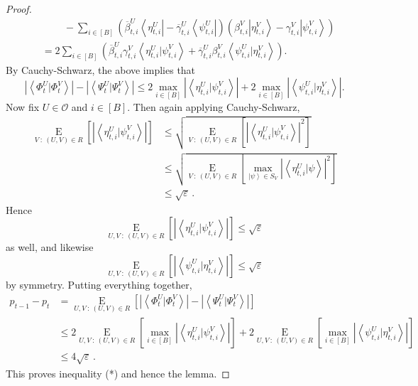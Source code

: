 \documentclass[10pt]{article}
\theoremstyle{definition}
\numberwithin{equation}{section}
\begin{document}
\begin{proof}
\begin{align*}
&  ~~~~~~~~~~-\sum_{i\in\left[  B\right]  }\left(  \overline{\beta}_{t,i}%
^{U}\left\langle \eta_{t,i}^{U}\right\vert -\overline{\gamma}_{t,i}%
^{U}\left\langle \psi_{t,i}^{U}\right\vert \right)  \left(  \beta_{t,i}%
^{V}\left\vert \eta_{t,i}^{V}\right\rangle -\gamma_{t,i}^{V}\left\vert
\psi_{t,i}^{V}\right\rangle \right) \\
&  =2\sum_{i\in\left[  B\right]  }\left(  \overline{\beta}_{t,i}^{U}%
\gamma_{t,i}^{V}\left\langle \eta_{t,i}^{U}|\psi_{t,i}^{V}\right\rangle
+\overline{\gamma}_{t,i}^{U}\beta_{t,i}^{V}\left\langle \psi_{t,i}^{U}%
|\eta_{t,i}^{V}\right\rangle \right)  .
\end{align*}
By Cauchy-Schwarz, the above implies that%
\[
\left\vert \left\langle \Phi_{t}^{U}|\Phi_{t}^{V}\right\rangle \right\vert
-\left\vert \left\langle \Psi_{t}^{U}|\Psi_{t}^{V}\right\rangle \right\vert
\leq2\max_{i\in\left[  B\right]  }\left\vert \left\langle \eta_{t,i}^{U}%
|\psi_{t,i}^{V}\right\rangle \right\vert +2\max_{i\in\left[  B\right]
}\left\vert \left\langle \psi_{t,i}^{U}|\eta_{t,i}^{V}\right\rangle
\right\vert .
\]
Now fix $U\in\mathcal{O}$ and $i\in\left[  B\right]  $. Then again applying
Cauchy-Schwarz,%
\begin{align*}
\operatorname*{E}_{V~:~\left(  U,V\right)  \in R}\left[  \left\vert
\left\langle \eta_{t,i}^{U}|\psi_{t,i}^{V}\right\rangle \right\vert \right]
&  \leq\sqrt{\operatorname*{E}_{V~:~\left(  U,V\right)  \in R}\left[
\left\vert \left\langle \eta_{t,i}^{U}|\psi_{t,i}^{V}\right\rangle \right\vert
^{2}\right]  }\\
&  \leq\sqrt{\operatorname*{E}_{V~:~\left(  U,V\right)  \in R}\left[
\max_{\left\vert \psi\right\rangle \in S_{V}}\left\vert \left\langle
\eta_{t,i}^{U}|\psi\right\rangle \right\vert ^{2}\right]  }\\
&  \leq\sqrt{\varepsilon}\,.
\end{align*}
Hence%
\[
\operatorname*{E}_{U,V~:~\left(  U,V\right)  \in R}\left[  \left\vert
\left\langle \eta_{t,i}^{U}|\psi_{t,i}^{V}\right\rangle \right\vert \right]
\leq\sqrt{\varepsilon}%
\]
as well, and likewise%
\[
\operatorname*{E}_{U,V~:~\left(  U,V\right)  \in R}\left[  \left\vert
\left\langle \psi_{t,i}^{U}|\eta_{t,i}^{V}\right\rangle \right\vert \right]
\leq\sqrt{\varepsilon}%
\]
by symmetry. Putting everything together,%
\begin{align*}
p_{t-1}-p_{t}  &  =\operatorname*{E}_{U,V~:~\left(  U,V\right)  \in R}\left[
\left\vert \left\langle \Phi_{t}^{U}|\Phi_{t}^{V}\right\rangle \right\vert
-\left\vert \left\langle \Psi_{t}^{U}|\Psi_{t}^{V}\right\rangle \right\vert
\right] \\
&  \leq2\operatorname*{E}_{U,V~:~\left(  U,V\right)  \in R}\left[  \max
_{i\in\left[  B\right]  }\left\vert \left\langle \eta_{t,i}^{U}|\psi_{t,i}%
^{V}\right\rangle \right\vert \right]  +2\operatorname*{E}_{U,V~:~\left(
U,V\right)  \in R}\left[  \max_{i\in\left[  B\right]  }\left\vert \left\langle
\psi_{t,i}^{U}|\eta_{t,i}^{V}\right\rangle \right\vert \right] \\
&  \leq4\sqrt{\varepsilon}\,.
\end{align*}
This proves inequality (*) and hence the lemma.
\end{proof}
\end{document}
